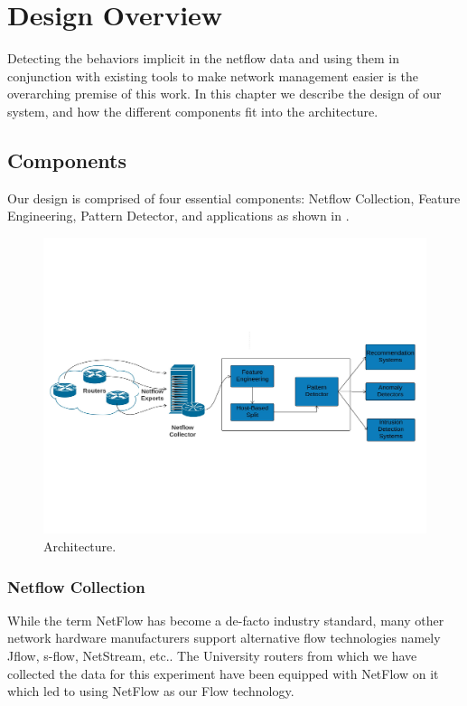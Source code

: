 
\chapter{Design Overview}

Detecting the behaviors implicit in the netflow data and
using them in conjunction with existing tools to make network management easier is the overarching premise of this work. In this chapter we describe the design of our system, and how the
different components fit into the architecture.

\section{Components}
Our design is comprised of four essential components: Netflow Collection, Feature Engineering, Pattern Detector, and
applications as shown in .
\begin{figure}[t]
	\centerline{\includegraphics[trim=4cm 4cm 4cm 4cm, scale = 0.6]{architecture.pdf}}
	\caption{Architecture.}%
\end{figure}

\subsection{Netflow Collection}
While the term NetFlow has become a de-facto industry standard, many other network hardware manufacturers support alternative flow technologies namely Jflow, s-flow, NetStream, etc.. The University routers from which we have collected the data for this experiment have been equipped with NetFlow on it which led to using NetFlow as our Flow technology. 
